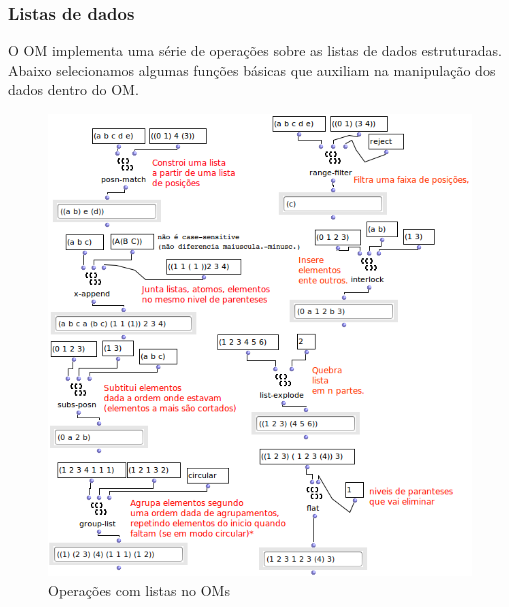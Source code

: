 \documentclass[
	12pt,				%
	openright,			%
	twoside,			%
	a4paper,			%
	english,			%
	french,				%
	spanish,			%
	brazil				%
	]{abntex2}
\begin{document}
\subsubsection{Listas de dados}

O OM implementa uma série de operações sobre as listas de dados estruturadas. Abaixo selecionamos algumas funções básicas que auxiliam na manipulação dos dados dentro do OM.

\begin{figure}[!h]
	\caption{\label{fig_grafico}Operações com listas no OMs}
	\begin{center}
	    \includegraphics[scale=0.7]{OMPD/OM-listas01.png}
	\end{center}
\end{figure}
\end{document}
